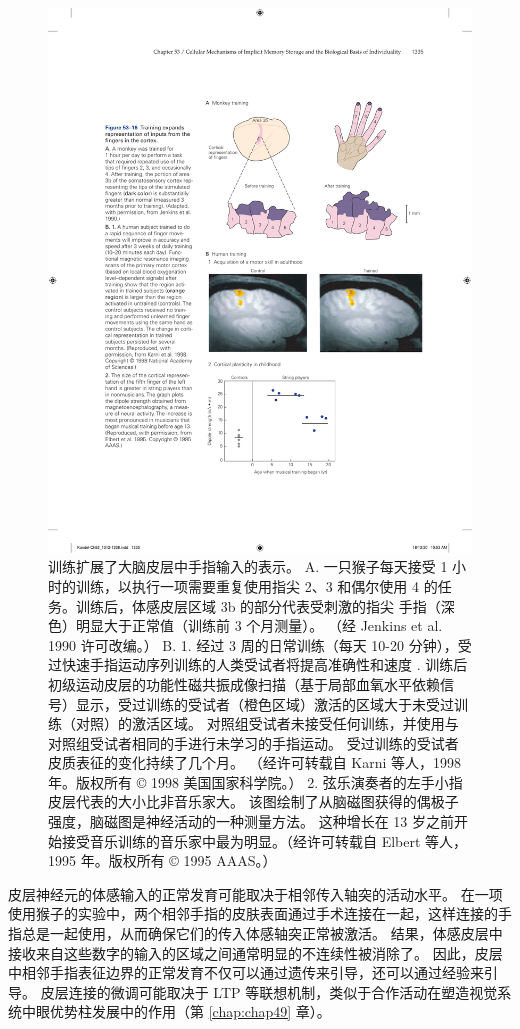 \begin{figure}[htbp]
	\centering
	\includegraphics[width=0.7\linewidth]{chap53/fig_53_16}
	\caption{训练扩展了大脑皮层中手指输入的表示。 A. 一只猴子每天接受 1 小时的训练，以执行一项需要重复使用指尖 2、3 和偶尔使用 4 的任务。训练后，体感皮层区域 3b 的部分代表受刺激的指尖 手指（深色）明显大于正常值（训练前 3 个月测量）。 （经 Jenkins et al. 1990 许可改编。） B. 1. 经过 3 周的日常训练（每天 10-20 分钟），受过快速手指运动序列训练的人类受试者将提高准确性和速度 . 训练后初级运动皮层的功能性磁共振成像扫描（基于局部血氧水平依赖信号）显示，受过训练的受试者（橙色区域）激活的区域大于未受过训练（对照）的激活区域。 对照组受试者未接受任何训练，并使用与对照组受试者相同的手进行未学习的手指运动。 受过训练的受试者皮质表征的变化持续了几个月。 （经许可转载自 Karni 等人，1998 年。版权所有 © 1998 美国国家科学院。） 2. 弦乐演奏者的左手小指皮层代表的大小比非音乐家大。 该图绘制了从脑磁图获得的偶极子强度，脑磁图是神经活动的一种测量方法。 这种增长在 13 岁之前开始接受音乐训练的音乐家中最为明显。（经许可转载自 Elbert 等人，1995 年。版权所有 © 1995 AAAS。）}
	\label{fig:53_16}
\end{figure}


皮层神经元的体感输入的正常发育可能取决于相邻传入轴突的活动水平。
在一项使用猴子的实验中，两个相邻手指的皮肤表面通过手术连接在一起，这样连接的手指总是一起使用，从而确保它们的传入体感轴突正常被激活。
结果，体感皮层中接收来自这些数字的输入的区域之间通常明显的不连续性被消除了。
因此，皮层中相邻手指表征边界的正常发育不仅可以通过遗传来引导，还可以通过经验来引导。
皮层连接的微调可能取决于 LTP 等联想机制，类似于合作活动在塑造视觉系统中眼优势柱发展中的作用（第 \ref{chap:chap49} 章）。


